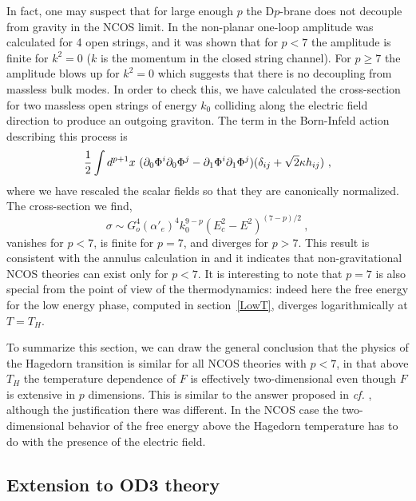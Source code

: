 In fact,
one may suspect that for large enough $p$ the D$p$-brane does not decouple
from gravity in the NCOS limit. In \cite{GMMS} the non-planar one-loop
amplitude was calculated for 4 open strings, 
and it was shown that for $p< 7$ the amplitude is finite for
$k^2=0$ ($k$ is the momentum in the closed string channel). 
For $p \geq 7$ the amplitude blows up for $k^2=0$
which suggests that there is no decoupling from massless
bulk modes. In order to check this, we have
calculated the cross-section for two massless open strings 
of energy $k_0$ colliding
along the electric field direction to produce an outgoing graviton.
The term in the Born-Infeld action describing this process is
$$ {1\over 2}\int d^{p+1} x\ 
(\partial_0 \Phi^i \partial_0 \Phi^j- 
\partial_1 \Phi^i \partial_1 \Phi^j)
(\delta_{ij} + \sqrt 2 \kappa h_{ij})
\ ,
$$
where we have rescaled the scalar fields so that they are canonically 
normalized. The cross-section we find,
$$\sigma \sim G_o^4 (\alpha'_e)^4  k_0^{9-p}
(E_c^2 - E^2)^{(7-p)/2}\ ,
$$
vanishes for $p<7$, is finite for $p=7$, and diverges for $p>7$.
This result is consistent with the annulus calculation in \cite{GMMS}
and it indicates that non-gravitational NCOS theories can
exist only for $p<7$.
It is interesting to note that $p=7$ is also special from the point of view
of the thermodynamics: indeed here the free energy for the
low energy phase, computed in section~\ref{LowT}, diverges
logarithmically at $T=T_H$.


To summarize this section, we can draw the general 
conclusion that the physics of the
Hagedorn transition is similar for all NCOS theories with $p<7$,
in that above $T_H$ the temperature dependence
of $F$ is effectively
two-dimensional even though $F$ is extensive in $p$ dimensions.  This is
similar to the answer proposed in {\it cf.} \cite{AW}, although the
justification there was different.
In the NCOS case the two-dimensional behavior of the free
energy above the Hagedorn temperature has to do with the presence of
the electric field.






\subsection{Extension to OD3 theory}
\label{OM}

